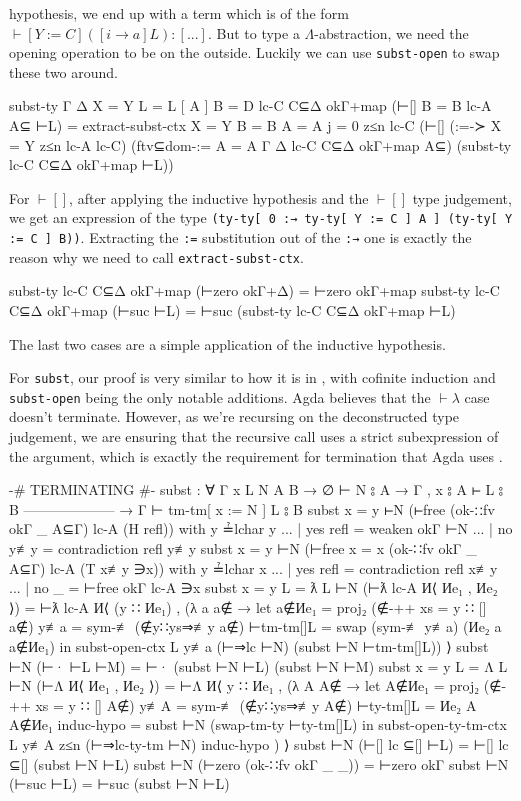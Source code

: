 \documentclass[logo,bsc,singlespacing,parskip,online]{infthesis}
\begin{document}
hypothesis, we end up with a term which is of the form $\vdash [Y := C] ([i \to a] L) \colon [...]$.
But to type a $\Lambda$-abstraction, we need the opening operation to be on the outside. Luckily we
can use \texttt{subst-open} to swap these two around.
\begin{code}
  subst-ty {Γ} {Δ} {X = Y} {L = L [ A ]} {B = D}
      lc-C C⊆Δ okΓ+map (⊢[] {B = B} lc-A A⊆ ⊢L)
    = extract-subst-ctx {X = Y} {B = B} {A = A} {j = 0} z≤n lc-C
      (⊢[]
        (:=-≻ {X = Y} z≤n lc-A lc-C)
        (ftv⊆dom-:= {A = A} Γ Δ lc-C C⊆Δ okΓ+map A⊆)
        (subst-ty lc-C C⊆Δ okΓ+map ⊢L))
\end{code}
For $\vdash[]$, after applying the inductive hypothesis and the $\vdash[]$ type judgement, we get an
expression of the type \texttt{(ty-ty[ 0 :→ ty-ty[ Y := C ] A ] (ty-ty[ Y := C ] B))}. Extracting
the \texttt{:=} substitution out of the \texttt{:→} one is exactly the reason why we need to call
\texttt{extract-subst-ctx}.
\begin{code}
  subst-ty lc-C C⊆Δ okΓ+map (⊢zero okΓ+Δ) = ⊢zero okΓ+map
  subst-ty lc-C C⊆Δ okΓ+map (⊢suc ⊢L) =
    ⊢suc (subst-ty lc-C C⊆Δ okΓ+map ⊢L)
\end{code}
The last two cases are a simple application of the inductive hypothesis.

For \texttt{subst}, our proof is very similar to how it is in \citet{wadler_programming_2022}, with
cofinite induction and \texttt{subst-open} being the only notable additions. Agda believes that the
$\vdash\lambda$ case doesn't terminate. However, as we're recursing on the deconstructed type
judgement, we are ensuring that the recursive call uses a strict subexpression of the argument,
which is exactly the requirement for termination that Agda uses
\citep{the_agda_community_termination_2024}.
\begin{code}
  {-# TERMINATING #-}
  subst : ∀ {Γ x L N A B}
    → ∅ ⊢ N ⦂ A
    → Γ , x ⦂ A ⊢ L ⦂ B
      --------------------
    → Γ ⊢ tm-tm[ x := N ] L ⦂ B
  subst {x = y} ⊢N (⊢free (ok-∷fv okΓ _ A⊆Γ) lc-A (H refl)) with y ≟lchar y
  ... | yes refl = weaken okΓ ⊢N
  ... | no  y≢y  = contradiction refl y≢y
  subst {x = y} ⊢N (⊢free {x = x} (ok-∷fv okΓ _ A⊆Γ) lc-A (T x≢y ∋x))
    with y ≟lchar x
  ... | yes refl = contradiction refl x≢y
  ... | no  _    = ⊢free okΓ lc-A ∋x
  subst {x = y} {L = ƛ L} ⊢N (⊢ƛ lc-A И⟨ Иe₁ , Иe₂ ⟩) =
    ⊢ƛ lc-A И⟨ (y ∷ Иe₁) , (λ a {a∉} →
      let a∉Иe₁ = proj₂ (∉-++ {xs = y ∷ []} a∉)
          y≢a = sym-≢ (∉y∷ys⇒≢y a∉)
          ⊢tm-tm[]L = swap (sym-≢ y≢a) (Иe₂ a {a∉Иe₁})
      in subst-open-ctx L y≢a (⊢⇒lc ⊢N) (subst ⊢N ⊢tm-tm[]L)) ⟩
  subst ⊢N (⊢· ⊢L ⊢M) = ⊢· (subst ⊢N ⊢L) (subst ⊢N ⊢M)
  subst {x = y} {L = Λ L} ⊢N (⊢Λ И⟨ Иe₁ , Иe₂ ⟩) =
    ⊢Λ И⟨ y ∷ Иe₁ , (λ A {A∉} →
      let A∉Иe₁ = proj₂ (∉-++ {xs = y ∷ []} A∉)
          y≢A = sym-≢ (∉y∷ys⇒≢y A∉)
          ⊢ty-tm[]L = Иe₂ A {A∉Иe₁}
          induc-hypo = subst ⊢N (swap-tm-ty ⊢ty-tm[]L)
      in subst-open-ty-tm-ctx L y≢A z≤n (⊢⇒lc-ty-tm ⊢N) induc-hypo ) ⟩
  subst ⊢N (⊢[] lc ⊆[] ⊢L) = ⊢[] lc ⊆[] (subst ⊢N ⊢L)
  subst ⊢N (⊢zero (ok-∷fv okΓ _ _)) = ⊢zero okΓ
  subst ⊢N (⊢suc ⊢L) = ⊢suc (subst ⊢N ⊢L)
\end{code}
\end{document}
